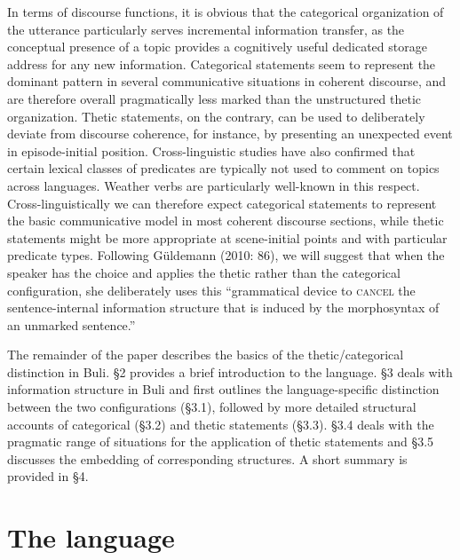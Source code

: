 \documentclass[output=paper]{langsci/langscibook}
\begin{document}
In terms of discourse functions, it is obvious that the categorical organization of the utterance particularly serves incremental information transfer, as the conceptual presence of a topic provides a cognitively useful dedicated storage address for any new information. Categorical statements seem to represent the dominant pattern in several communicative situations in coherent discourse, and are therefore overall pragmatically less marked than the unstructured thetic organization. Thetic statements, on the contrary, can be used to deliberately deviate from discourse coherence, for instance, by presenting an unexpected event in episode-initial position. Cross-linguistic studies \citep{Sasse1995} have also confirmed that certain lexical classes of predicates are typically not used to comment on topics across languages. Weather verbs are particularly well-known in this respect. Cross-linguistically we can therefore expect categorical statements to represent the basic communicative model in most coherent discourse sections, while thetic statements might be more appropriate at scene-initial points and with particular predicate types. Following Güldemann (2010: 86), we will suggest that when the speaker has the choice and applies the thetic rather than the categorical configuration, she deliberately uses this “grammatical device to \textsc{cancel} the sentence-internal information structure that is induced by the morphosyntax of an unmarked sentence.”

The remainder of the paper describes the basics of the thetic/categorical distinction in Buli. §2 provides a brief introduction to the language. §3 deals with information structure in Buli and first outlines the language-specific distinction between the two configurations (§3.1), followed by more detailed structural accounts of categorical (§3.2) and thetic statements (§3.3). §3.4 deals with the pragmatic range of situations for the application of thetic statements and §3.5 discusses the embedding of corresponding structures. A short summary is provided in §4.

\section{ The language}
\end{document}
